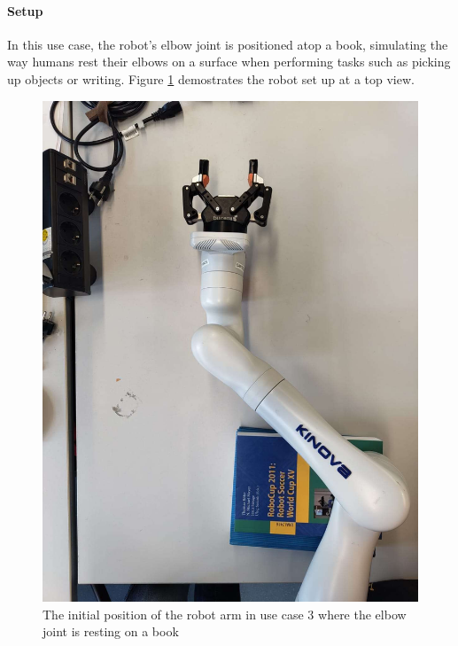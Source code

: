 \documentclass[report.tex]{subfiles}
\begin{document}
    \paragraph{\large{Setup}\\}
    In this use case, the robot's elbow joint is positioned atop a book, simulating the way humans rest their elbows on a surface when performing tasks such as picking up objects or writing. Figure \ref{fig:us3_init} demostrates the robot set up at a top view.
    \begin{figure}[H]
        \centering
        \captionsetup[figure]{justification=centering}
        \includegraphics[width=0.5\linewidth]{images/us3_initial.jpg}
        \caption{The initial position of the robot arm in use case 3 where the elbow joint is resting on a book}
        \label{fig:us3_init}
    \end{figure}








\end{document}
